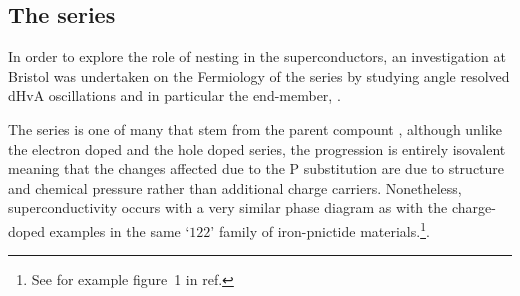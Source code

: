 
\subsection{The \BaFePAs series}

In order to explore the role of nesting in the \highTc superconductors, an investigation at Bristol was undertaken on the Fermiology of the \BaFePAs series by studying angle resolved \ac{dHvA} oscillations and in particular the end-member, \BaFeP.

The \BaFePAs series is one of many that stem from the parent compount \BaFeAs, although unlike the electron doped \BaCoFeAs and the hole doped \BaKFeAs series, the \BaFePAs progression is entirely isovalent meaning that the changes affected due to the P substitution are due to structure and chemical pressure rather than additional charge carriers. Nonetheless, superconductivity occurs with a very similar phase diagram as with the charge-doped examples in the same `$122$' family of iron-pnictide materials.\footnote{See for example figure~1 in ref.\cite{Paglione2010}}. 

